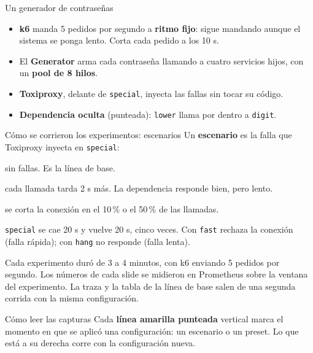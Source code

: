 \documentclass[institutional,screen,none]{ua-engineering-v6-beamer}
\begin{document}

\begin{frame}{Un generador de contraseñas}

\begin{itemize}
\item \textbf{k6} manda 5 pedidos por segundo a \textbf{ritmo fijo}: sigue mandando aunque el sistema se ponga lento. Corta cada pedido a los 10 s.
\item El \textbf{Generator} arma cada contraseña llamando a cuatro servicios hijos, con un \textbf{pool de 8 hilos}.
\item \textbf{Toxiproxy}, delante de \texttt{special}, inyecta las fallas sin tocar su código.
\item \textbf{Dependencia oculta} (punteada): \texttt{lower} llama por dentro a \texttt{digit}.
\end{itemize}
\end{frame}

\begin{frame}{Cómo se corrieron los experimentos: escenarios}
Un \textbf{escenario} es la falla que Toxiproxy inyecta en \texttt{special}:
\begin{description}\small
\item[\texttt{baseline}:] sin fallas. Es la línea de base.
\item[\texttt{latency 2000}:] cada llamada tarda 2 s más. La dependencia responde bien, pero lento.
\item[\texttt{errors 0.1} / \texttt{0.5}:] se corta la conexión en el 10\,\% o el 50\,\% de las llamadas.
\item[\texttt{intermittent}:] \texttt{special} se cae 20 s y vuelve 20 s, cinco veces. Con \texttt{fast} rechaza la conexión (falla rápida); con \texttt{hang} no responde (falla lenta).
\end{description}

\vspace{0.3em}
{\small Cada experimento duró de 3 a 4 minutos, con k6 enviando 5 pedidos por segundo. Los números de cada slide se midieron en Prometheus sobre la ventana del experimento. La traza y la tabla de la línea de base salen de una segunda corrida con la misma configuración.}

\begin{block}{Cómo leer las capturas}
Cada \textbf{línea amarilla punteada} vertical marca el momento en que se aplicó una configuración: un escenario o un preset. Lo que está a su derecha corre con la configuración nueva.
\end{block}
\end{frame}
\end{document}
